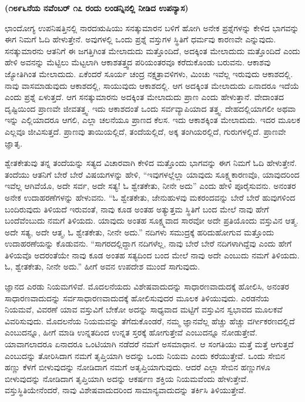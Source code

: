 \centerline{\textbf{(೧೮೯೬ನೆಯ ನವೆಂಬರ್​ ೧೭ ರಂದು ಲಂಡನ್ನಿನಲ್ಲಿ ನೀಡಿದ ಉಪನ್ಯಾಸ)}}

ಛಾಂದೋಗ್ಯ ಉಪನಿಷತ್ತಿನಲ್ಲಿ ನಾರದಋಷಿಯು ಸನತ್ಕುಮಾರನ ಬಳಿಗೆ ಹೋಗಿ ಅನೇಕ ಪ್ರಶ್ನೆಗಳನ್ನು ಕೇಳಿದ ಭಾಗವನ್ನು ಈಗ ನಿಮಗೆ ಓದಿ ಹೇಳುತ್ತೇನೆ. ಅವುಗಳಲ್ಲಿ ಒಂದು ಪ್ರಶ್ನೆ ವಸ್ತುಗಳ ಸ್ಥಿತಿಗೆ ಧರ್ಮವು ಕಾರಣವೇ ಎನ್ನುವುದು. ಸನತ್ಕುಮಾರನು ಆತನಿಗೆ ಈ ಜಗತ್ತಿಗಿಂತ ಮೇಲಾದುದು ಮತ್ತೊಂದಿದೆ, ಅದಕ್ಕಿಂತ ಮೇಲಾದುದು ಮತ್ತೊಂದಿದೆ ಎಂದು ಹೇಳಿ ಅವನನ್ನು ಮೆಟ್ಟಿಲು ಮೆಟ್ಟಲಾಗಿ ಆಕಾಶತತ್ತ್ವದ ಪರಿಯಂತರವೂ ಕರೆದುಕೊಂಡು ಬರುವನು. ಆಕಾಶವು ಜ್ಯೋತಿಗಿಂತ ಮೇಲಾದುದು. ಏಕೆಂದರೆ ಸೂರ್ಯ ಚಂದ್ರ ನಕ್ಷತ್ರಾವಳಿಗಳು, ಮಿಂಚು ಇವೆಲ್ಲ ಇರುವುದು ಆಕಾಶದಲ್ಲಿ. ನಾವು ವಾಸಮಾಡುವುದು ಆಕಾಶದಲ್ಲಿ, ಸಾಯುವುದು ಆಕಾಶದಲ್ಲಿ. ಆಗ ಅದಕ್ಕಿಂತ ಮೇಲಾದುದು ಏನಾದರೂ ಇದೆಯೆ ಎಂದು ಪ್ರಶ್ನೆ ಏಳುತ್ತದೆ. ಆಗ ಸನತ್ಕುಮಾರನು ಅದಕ್ಕಿಂತ ಮೇಲಾದುದು ಪ್ರಾಣ ಎಂದು ಹೇಳುತ್ತಾನೆ. ವೇದಾಂತದ ದೃಷ್ಟಿಯಿಂದ ಪ್ರಾಣವೇ ಜೀವತತ್ತ್ವ. ಇದು ಆಕಾಶದಂತೆ ಒಂದು ಸರ್ವವ್ಯಾಪಿಯಾದ ತತ್ತ್ವ. ದೇಹದಲ್ಲಿಯಾಗಲೀ ಅಥವಾ ಇನ್ನು ಎಲ್ಲಿಯಾದರೂ ಆಗಲಿ, ಎಲ್ಲಾ ಚಲನೆಯೂ ಪ್ರಾಣದ ಕೆಲಸ. ಇದು ಆಕಾಶಕ್ಕಿಂತ ಮೇಲಾದುದು. ಇದರ ಮೂಲಕ ಎಲ್ಲವೂ ಜೀವಿಸುತ್ತದೆ. ಪ್ರಾಣವು ತಾಯಿಯಲ್ಲಿದೆ, ತಂದೆಯಲ್ಲಿದೆ, ಅಕ್ಕ ತಂಗಿಯರಲ್ಲಿದೆ, ಗುರುಗಳಲ್ಲಿದೆ. ಪ್ರಾಣವೇ ಜ್ಞಾತೃ. 



ಶ್ವೇತಕೇತುವು ತನ್ನ ತಂದೆಯನ್ನು ಸತ್ಯದ ವಿಚಾರವಾಗಿ ಕೇಳಿದ ಮತ್ತೊಂದು ಭಾಗವನ್ನು ಈಗ ನಿಮಗೆ ಓದಿ ಹೇಳುತ್ತೇನೆ. ತಂದೆಯು ಆತನಿಗೆ ಬೇರೆ ಬೇರೆ ವಿಷಯಗಳನ್ನು ಹೇಳಿ, “ಇವುಗಳಲ್ಲೆಲ್ಲಾ ಯಾವುದು ಸೂಕ್ಷ್ಮಕಾರಣವೊ, ಯಾವುದರಿಂದ ಇವೆಲ್ಲ ಆಗಿವೆಯೊ, ಅದೇ ಸರ್ವ, ಅದೇ ಸತ್ಯ! ಓ ಶ್ವೇತಕೇತು, ನೀನೇ ಅದು” ಎಂದು ಹೇಳಿ ಪೂರೈಸುವನು. ಅನಂತರ ಅನೇಕ ಉದಾಹರಣೆಗಳನ್ನು ಹೇಳುವನು. “ಓ ಶ್ವೇತಕೇತು, ಜೇನುಹುಳವು ಮಕರಂದವನ್ನು ಬೇರೆ ಬೇರೆ ಹುವುಗಳಿಂದ ಬಂದಿರುವುದು ತಿಳಿಯದೆ ಇರುವಂತೆ, ನಾವು ಕೂಡ ಅಂತಹ ಅತ್ಯುತ್ತಮ ಸ್ಥಿತಿಗೆ ಬಂದ ಮೇಲೆ ನಾವು ಹೇಗೆ ಬಂದೆವೆಂಬುದು ನಮಗೆ ತಿಳಿಯದು. ಯಾವುದು ಅಂತಹ ಸೂಕ್ಷ್ಮವಾದ ಸಾರವೋ ಅದೇ ಪ್ರತಿಯೊಂದು ವಸ್ತುವಿನ ಆತ್ಮ. ಅದೇ ಸತ್ಯ, ಅದೇ ಆತ್ಮ, ಓ ಶ್ವೇತಕೇತು, ನೀನೇ ಅದು.” ನದಿಗಳು ಸಮುದ್ರಕ್ಕೆ ಹರಿದುಹೋಗುವ ಮತ್ತೊಂದು ಉದಾಹರಣೆಯನ್ನು ಕೊಡುವನು. “ಸಾಗರದಲ್ಲಿದ್ದಾಗ ನದಿಗಳೆಲ್ಲ, ನಾವು ಬೇರೆ ಬೇರೆ ನದಿಗಳಾಗಿದ್ದೆವು ಎಂದು ಹೇಗೆ ತಿಳಿಯವೊ ಅದರಂತೆಯೇ ನಾವು ಕೂಡ ಅಂತಹ ಸತ್ಯದಿಂದ ಬಂದ ಮೇಲೆ ನಾವು ಅದೇ ಎಂಬುದು ನಮಗೆ ತಿಳಿಯದು. ಓ, ಶ್ವೇತಕೇತು, ನೀನೇ ಅದು.” ಹೀಗೆ ಅವನ ಉಪದೇಶ ಮುಂದೆ ಸಾಗುವುದು. 


ಜ್ಞಾನದ ಎರಡು ನಿಯಮಗಳಿವೆ. ಮೊದಲನೆಯದು ವಿಶೇಷವಾದುದನ್ನು ಸಾಧಾರಣವಾದುದಕ್ಕೆ ಹೋಲಿಸಿ, ಅನಂತರ ಸಾಧಾರಣವಾದುದನ್ನು ಸರ್ವಸಾಧಾರಣವಾದುದಕ್ಕೆ ಹೋಲಿಸುವುದರ ಮೂಲಕ ತಿಳಿಯುವುದು. ಎರಡನೆಯ ನಿಯಮವೆ, ವಿವರಣೆ ಯಾವ ವಸ್ತುವಿಗೆ ಬೇಕೋ ಅದನ್ನು ಸಾಧ್ಯವಾದ ಮಟ್ಟಿಗೆ ವಸ್ತುವಿನ ಸ್ವಭಾವದ ಮೂಲಕವೆ ವಿವರಿಸುವುದು. ಮೊದಲನೆಯ ನಿಯಮವನ್ನು ತೆಗೆದುಕೊಂಡರೆ, ನಮ್ಮ ಜ್ಞಾನವೆಲ್ಲ ಹೆಚ್ಚು ಹೆಚ್ಚು ವರ್ಗೀಕರಣದಲ್ಲಿದೆ ಎಂಬುದನ್ನೂ, ಹೀಗೆ ಮಾಡಿ ಉನ್ನತದಿಂದ ಉನ್ನತ ಸ್ತರಕ್ಕೆ ಹೋಗುತ್ತೇವೆ ಎಂಬುದನ್ನೂ ನೋಡುತ್ತೇವೆ. ಯಾವಾಗಲಾದರೂ ಏನಾದರೂ ಒಂಟಿಯಾಗಿ ನಡೆದರೆ ನಮಗೆ ಅಸಮಾಧಾನ. ಆ ಸಂಗತಿಯು ಮತ್ತೆ ಮತ್ತೆ ಆಗುತ್ತದೆ ಎಂಬುದನ್ನು ತೋರಿಸಿದಾಗ ನಮಗೆ ತೃಪ್ತಿಯಾಗಿ ಅದನ್ನು ಒಂದು ನಿಯಮ ಎಂದು ಕರೆಯುತ್ತೇವೆ. ಒಂದು ಸೇಬಿನ ಹಣ್ಣು ಕೆಳಗೆ ಬೀಳುವುದನ್ನು ನೋಡಿದಾಗ ನಮಗೆ ಅತೃಪ್ತಿಯಾಗುವುದು. ಆದರೆ ಎಲ್ಲಾ ಸೇಬಿನ ಹಣ್ಣುಗಳೂ ಬೀಳುವುದನ್ನು ನೋಡಿದಾಗ ತೃಪ್ತಿಯಾಗಿ ಅದನ್ನು ಆಕರ್ಷಣ ಶಕ್ತಿಯ ನಿಯಮವೆಂದು ಹೇಳುತ್ತೇವೆ. ವಸ್ತುಸ್ಥಿತಿಯೇನೆಂದರೆ, ನಾವು ವಿಶೇಷವಾದುದರಿಂದ ಸಾಮಾನ್ಯವಾದುದನ್ನು ತರ್ಕಿಸಿ ತಿಳಿಯುತ್ತೇವೆ. 

